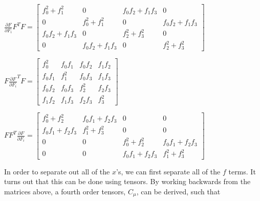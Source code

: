 \documentclass[twocolumn,10pt]{asme2ej}
\begin{document}
\begin{center}
$\frac{\partial F}{\partial F_i}F^TF = \begin{bmatrix} f_{0}^2 + f_{1}^2 & 0 & f_0f_2 + f_1f_3 & 0 \\
0 & f_{0}^2 + f_{1}^2 & 0 & f_0f_2 + f_1f_3 \\
f_0f_2 + f_1f_3 & 0 & f_{2}^2 + f_{3}^2 & 0 \\
0 & f_0f_2 + f_1f_3 & 0 & f_{2}^2 + f_{3}^2 \end{bmatrix}$

\bigskip
$F\frac{\partial F}{\partial F_i}^TF = \begin{bmatrix} f_{0}^2 & f_0f_1 & f_0f_2 & f_1f_2  \\
f_0f_1 & f_{1}^2 & f_0f_3 & f_1f_3 \\
f_0f_2 & f_0f_3 & f_{2}^2 & f_2f_3 \\
f_1f_2 & f_1f_3 & f_2f_3 & f_{3}^2 \end{bmatrix}$

\bigskip
$FF^T\frac{\partial F}{\partial F_i} = \begin{bmatrix} f_{0}^2 + f_{2}^2 & f_0f_1 + f_2f_3 & 0 & 0  \\
f_0f_1 + f_2f_3 & f_{1}^2 + f_{3}^2 & 0 & 0 \\
0 & 0 & f_{0}^2 + f_{2}^2 & f_0f_1 + f_2f_3 \\
0 & 0 & f_0f_1 + f_2f_3 & f_{1}^2 + f_{3}^2 \end{bmatrix}$
\end{center}

In order to separate out all of the $x$'s, we can first separate all of the $f$ terms. It turns out that this can be done using tensors. By working backwards from the matrices above, a fourth order tensors, $C_{\mu}$, can be derived, such that
\end{document}
